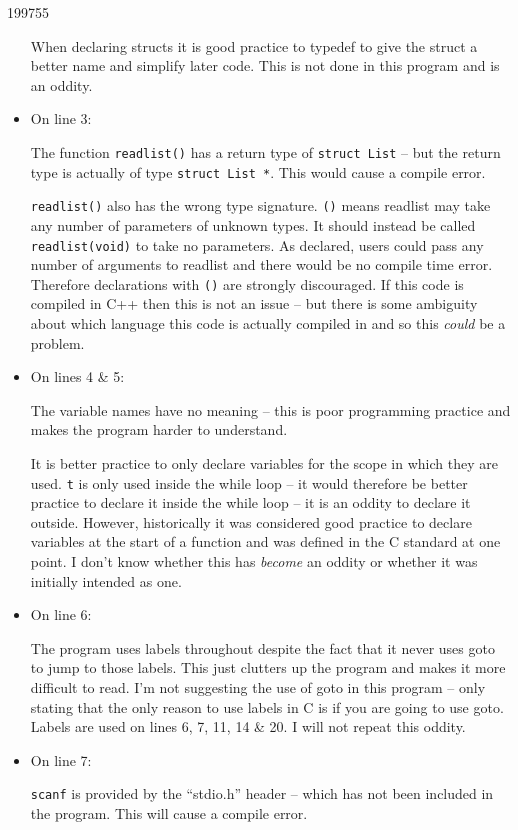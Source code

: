 \documentclass[10pt,\jkfside,a4paper]{article}
\begin{document}
\begin{examquestion}{1997}{5}{5}
\begin{itemize}
When declaring structs it is good practice to typedef to give the struct a
better name and simplify later code. This is not done in this program and is
an oddity.

\item On line 3:

The function \texttt{readlist()} has a return type of \texttt{struct List} --
but the return type is actually of type \texttt{struct List *}. This would
cause a compile error.

\texttt{readlist()} also has the wrong type signature. \texttt{()} means
readlist may take any number of parameters of unknown types. It should
instead be called \texttt{readlist(void)} to take no parameters. As declared,
users could pass any number of arguments to readlist and there would be no
compile time error. Therefore declarations with \texttt{()} are strongly
discouraged. If this code is compiled in C++ then this is not an issue --
but there is some ambiguity about which language this code is actually
compiled in and so this \textit{could} be a problem.

\item On lines 4 \& 5:

The variable names have no meaning -- this is poor programming practice and
makes the program harder to understand.

It is better practice to only declare variables for the scope in which they
are used. \texttt{t} is only used inside the while loop -- it would therefore
be better practice to declare it inside the while loop -- it is an oddity to
declare it outside. However, historically it was considered good practice to
declare variables at the start of a function and was defined in the C
standard at one point. I don't know whether this has \textit{become} an
oddity or whether it was initially intended as one.

\item On line 6:

The program uses labels throughout despite the fact that it never uses
goto to jump to those labels. This just clutters up the program and makes it
more difficult to read. I'm not suggesting the use of goto in this program --
only stating that the only reason to use labels in C is if you are going to
use goto. Labels are used on lines 6, 7, 11, 14 \& 20. I will not repeat
this oddity.

\item On line 7:

\texttt{scanf} is provided by the ``stdio.h'' header -- which has not been
included in the program. This will cause a compile error.


\end{itemize}
\end{examquestion}
\end{document}
